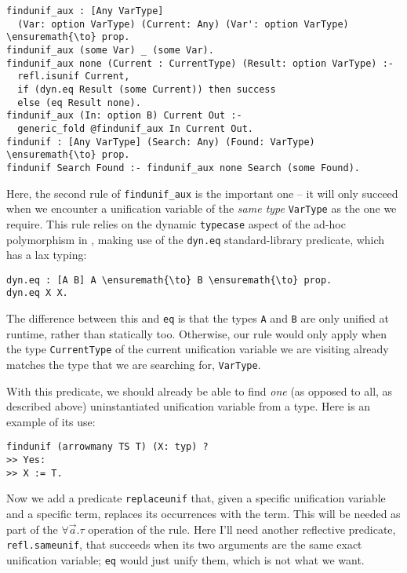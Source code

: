 \begin{verbatim}
findunif_aux : [Any VarType]
  (Var: option VarType) (Current: Any) (Var': option VarType) \ensuremath{\to} prop.
findunif_aux (some Var) _ (some Var).
findunif_aux none (Current : CurrentType) (Result: option VarType) :-
  refl.isunif Current,
  if (dyn.eq Result (some Current)) then success
  else (eq Result none).
findunif_aux (In: option B) Current Out :-
  generic_fold @findunif_aux In Current Out.
findunif : [Any VarType] (Search: Any) (Found: VarType) \ensuremath{\to} prop.
findunif Search Found :- findunif_aux none Search (some Found).
\end{verbatim}

Here, the second rule of \texttt{findunif\_aux} is the important one --
it will only succeed when we encounter a unification variable of the
\emph{same type} \texttt{VarType} as the one we require. This rule
relies on the dynamic \texttt{typecase} aspect of the ad-hoc
polymorphism in \lamprolog, making use of the \texttt{dyn.eq}
standard-library predicate, which has a lax typing:

\begin{verbatim}
dyn.eq : [A B] A \ensuremath{\to} B \ensuremath{\to} prop.
dyn.eq X X.
\end{verbatim}

The difference between this and \texttt{eq} is that the types \texttt{A}
and \texttt{B} are only unified at runtime, rather than statically too.
Otherwise, our rule would only apply when the type \texttt{CurrentType}
of the current unification variable we are visiting already matches the
type that we are searching for, \texttt{VarType}.

With this predicate, we should already be able to find \emph{one} (as
opposed to all, as described above) uninstantiated unification variable
from a type. Here is an example of its use:

\begin{verbatim}
findunif (arrowmany TS T) (X: typ) ?
>> Yes:
>> X := T.
\end{verbatim}

Now we add a predicate \texttt{replaceunif} that, given a specific
unification variable and a specific term, replaces its occurrences with
the term. This will be needed as part of the \(\forall \vec{a}.\tau\)
operation of the rule. Here I'll need another reflective predicate,
\texttt{refl.sameunif}, that succeeds when its two arguments are the
same exact unification variable; \texttt{eq} would just unify them,
which is not what we want.

